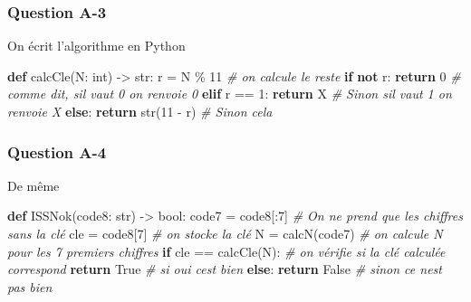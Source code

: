 \documentclass[
  12pt,
  a4paper,
]{article}
\newenvironment{Shaded}{}{}
\newcommand{\BuiltInTok}[1]{#1}
\newcommand{\CommentTok}[1]{\textcolor[rgb]{0.38,0.63,0.69}{\textit{#1}}}
\newcommand{\ControlFlowTok}[1]{\textcolor[rgb]{0.00,0.44,0.13}{\textbf{#1}}}
\newcommand{\DecValTok}[1]{\textcolor[rgb]{0.25,0.63,0.44}{#1}}
\newcommand{\KeywordTok}[1]{\textcolor[rgb]{0.00,0.44,0.13}{\textbf{#1}}}
\newcommand{\NormalTok}[1]{#1}
\newcommand{\OperatorTok}[1]{\textcolor[rgb]{0.40,0.40,0.40}{#1}}
\newcommand{\StringTok}[1]{\textcolor[rgb]{0.25,0.44,0.63}{#1}}
\newcommand{\VariableTok}[1]{\textcolor[rgb]{0.10,0.09,0.49}{#1}}
\begin{document}
\hypertarget{question-a-3}{%
\subsubsection{Question A-3}\label{question-a-3}}

On écrit l'algorithme en Python

\begin{Shaded}
\begin{Highlighting}[]
\KeywordTok{def}\NormalTok{ calcCle(N: }\BuiltInTok{int}\NormalTok{) }\OperatorTok{{-}\textgreater{}} \BuiltInTok{str}\NormalTok{:}
\NormalTok{    r }\OperatorTok{=}\NormalTok{ N }\OperatorTok{\%} \DecValTok{11} \CommentTok{\# on calcule le reste}
    \ControlFlowTok{if} \KeywordTok{not}\NormalTok{ r:}
        \ControlFlowTok{return} \StringTok{\textquotesingle{}0\textquotesingle{}}  \CommentTok{\# comme dit, s\textquotesingle{}il vaut 0 on renvoie \textquotesingle{}0\textquotesingle{}}
    \ControlFlowTok{elif}\NormalTok{ r }\OperatorTok{==} \DecValTok{1}\NormalTok{:}
        \ControlFlowTok{return} \StringTok{\textquotesingle{}X\textquotesingle{}} \CommentTok{\# Sinon s\textquotesingle{}il vaut 1 on renvoie \textquotesingle{}X\textquotesingle{}}
    \ControlFlowTok{else}\NormalTok{:}
        \ControlFlowTok{return} \BuiltInTok{str}\NormalTok{(}\DecValTok{11} \OperatorTok{{-}}\NormalTok{ r) }\CommentTok{\# Sinon cela}
\end{Highlighting}
\end{Shaded}

\hypertarget{question-a-4}{%
\subsubsection{Question A-4}\label{question-a-4}}

De même

\begin{Shaded}
\begin{Highlighting}[]
\KeywordTok{def}\NormalTok{ ISSNok(code8: }\BuiltInTok{str}\NormalTok{) }\OperatorTok{{-}\textgreater{}} \BuiltInTok{bool}\NormalTok{:}
\NormalTok{    code7 }\OperatorTok{=}\NormalTok{ code8[:}\DecValTok{7}\NormalTok{] }\CommentTok{\# On ne prend que les chiffres sans la clé}
\NormalTok{    cle }\OperatorTok{=}\NormalTok{ code8[}\DecValTok{7}\NormalTok{] }\CommentTok{\# on stocke la clé}
\NormalTok{    N }\OperatorTok{=}\NormalTok{ calcN(code7) }\CommentTok{\# on calcule N pour les 7 premiers chiffres}
    \ControlFlowTok{if}\NormalTok{ cle }\OperatorTok{==}\NormalTok{ calcCle(N):   }\CommentTok{\# on vérifie si la clé calculée correspond}
        \ControlFlowTok{return} \VariableTok{True}  \CommentTok{\# si oui c\textquotesingle{}est bien}
    \ControlFlowTok{else}\NormalTok{:}
        \ControlFlowTok{return} \VariableTok{False} \CommentTok{\# sinon ce n\textquotesingle{}est pas bien}
\end{Highlighting}
\end{Shaded}
\end{document}
